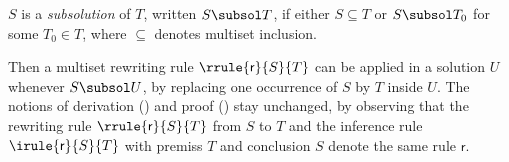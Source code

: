 \begin{definition}[Subsolution]
  $S$ is a \emph{subsolution} of $T$, written $S \subsol T$, if either $S
  \subseteq T$ or $S \subsol T_0$ for some $T_0 \in T$, where $\subseteq$
  denotes multiset inclusion. 
\end{definition}

Then a multiset rewriting rule $\rrule{\mathsf{r}}{S}{T}$ can be applied in a
solution $U$ whenever $S \subsol U$, by replacing one occurrence of $S$ by $T$
inside $U$. The notions of derivation () and proof
() stay unchanged, by observing that the rewriting rule
$\rrule{\mathsf{r}}{S}{T}$ from $S$ to $T$ and the inference rule
$\irule{\mathsf{r}}{S}{T}$ with premiss $T$ and conclusion $S$ denote the same
rule $\mathsf{r}$.


